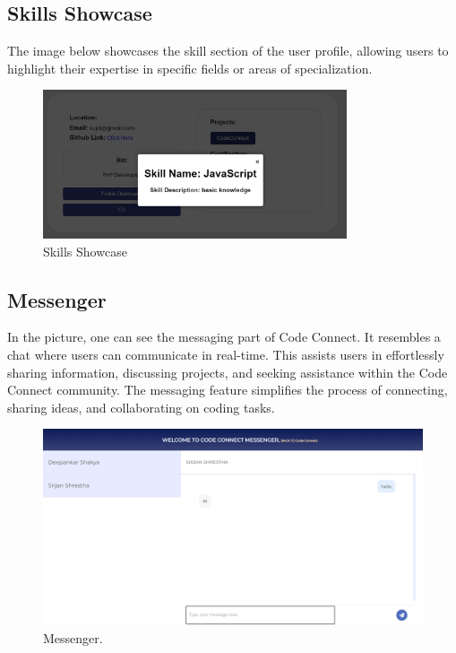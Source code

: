 
\subsection{Skills Showcase}
The image below showcases the skill section of the user profile, allowing users to highlight their expertise in specific fields or areas of specialization. 
\begin{figure}[H]
    \centering
    \includegraphics[width=0.8\textwidth]{Outcome-ss/skill-showcase.png}
    \caption{Skills Showcase}
    \label{fig:Skills Showcase}
\end{figure}
\subsection{Messenger}
In the picture, one can see the messaging part of Code Connect. It resembles a chat where users can communicate in real-time. This assists users in effortlessly sharing information, discussing projects, and seeking assistance within the Code Connect community. The messaging feature simplifies the process of connecting, sharing ideas, and collaborating on coding tasks.
\begin{figure}[H]
    \centering
    \includegraphics[width=1\textwidth]{Outcome-ss/messenger-full-block.png}
    \caption{Messenger.}
    \label{fig:Messenger}
\end{figure}

